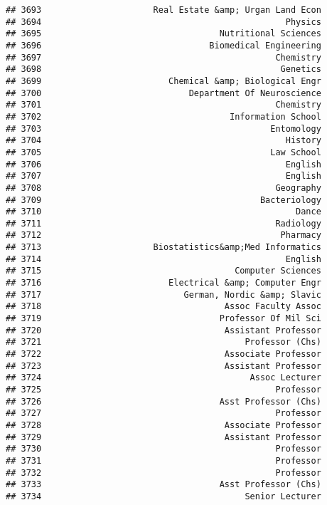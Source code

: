 \documentclass[
]{article}
\begin{document}
\begin{verbatim}
## 3693                      Real Estate &amp; Urgan Land Econ
## 3694                                                Physics
## 3695                                   Nutritional Sciences
## 3696                                 Biomedical Engineering
## 3697                                              Chemistry
## 3698                                               Genetics
## 3699                         Chemical &amp; Biological Engr
## 3700                             Department Of Neuroscience
## 3701                                              Chemistry
## 3702                                     Information School
## 3703                                             Entomology
## 3704                                                History
## 3705                                             Law School
## 3706                                                English
## 3707                                                English
## 3708                                              Geography
## 3709                                           Bacteriology
## 3710                                                  Dance
## 3711                                              Radiology
## 3712                                               Pharmacy
## 3713                      Biostatistics&amp;Med Informatics
## 3714                                                English
## 3715                                      Computer Sciences
## 3716                         Electrical &amp; Computer Engr
## 3717                            German, Nordic &amp; Slavic
## 3718                                    Assoc Faculty Assoc
## 3719                                   Professor Of Mil Sci
## 3720                                    Assistant Professor
## 3721                                        Professor (Chs)
## 3722                                    Associate Professor
## 3723                                    Assistant Professor
## 3724                                         Assoc Lecturer
## 3725                                              Professor
## 3726                                   Asst Professor (Chs)
## 3727                                              Professor
## 3728                                    Associate Professor
## 3729                                    Assistant Professor
## 3730                                              Professor
## 3731                                              Professor
## 3732                                              Professor
## 3733                                   Asst Professor (Chs)
## 3734                                        Senior Lecturer

\end{verbatim}
\end{document}
